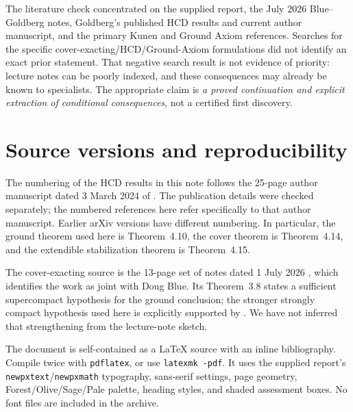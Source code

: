 \documentclass[11pt,letterpaper]{article}
\theoremstyle{definition}
\begin{document}
The literature check concentrated on the supplied report, the July 2026 Blue--Goldberg notes, Goldberg's published HCD results and current author manuscript, and the primary Kunen and Ground Axiom references. Searches for the specific cover-exacting/HCD/Ground-Axiom formulations did not identify an exact prior statement. That negative search result is not evidence of priority: lecture notes can be poorly indexed, and these consequences may already be known to specialists. The appropriate claim is \emph{a proved continuation and explicit extraction of conditional consequences}, not a certified first discovery.

\section{Source versions and reproducibility}\label{app:sources}

The numbering of the HCD results in this note follows the 25-page author manuscript dated 3 March 2024 of \cite{uniqueness}. The publication details were checked separately; the numbered references here refer specifically to that author manuscript. Earlier arXiv versions have different numbering. In particular, the ground theorem used here is Theorem~4.10, the cover theorem is Theorem~4.14, and the extendible stabilization theorem is Theorem~4.15.

The cover-exacting source is the 13-page set of notes dated 1 July 2026 \cite{cover}, which identifies the work as joint with Doug Blue. Its Theorem~3.8 states a sufficient supercompact hypothesis for the ground conclusion; the stronger strongly compact hypothesis used here is explicitly supported by \cite[Theorem 4.10]{uniqueness}. We have not inferred that strengthening from the lecture-note sketch.

The document is self-contained as a \LaTeX{} source with an inline bibliography. Compile twice with \texttt{pdflatex}, or use \texttt{latexmk -pdf}. It uses the supplied report's \texttt{newpxtext}/\texttt{newpxmath} typography, sans-serif settings, page geometry, Forest/Olive/Sage/Pale palette, heading styles, and shaded assessment boxes. No font files are included in the archive.
\end{document}
